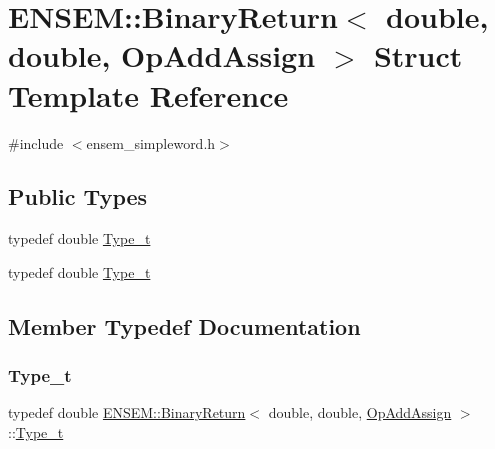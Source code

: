 \hypertarget{structENSEM_1_1BinaryReturn_3_01double_00_01double_00_01OpAddAssign_01_4}{}\section{E\+N\+S\+EM\+:\+:Binary\+Return$<$ double, double, Op\+Add\+Assign $>$ Struct Template Reference}
\label{structENSEM_1_1BinaryReturn_3_01double_00_01double_00_01OpAddAssign_01_4}


{\ttfamily \#include $<$ensem\+\_\+simpleword.\+h$>$}

\subsection*{Public Types}
\begin{DoxyCompactItemize}
\item 
typedef double \mbox{\hyperlink{structENSEM_1_1BinaryReturn_3_01double_00_01double_00_01OpAddAssign_01_4_a9b6757965dc033c66ff45da5c69ea6cc}{Type\+\_\+t}}
\item 
typedef double \mbox{\hyperlink{structENSEM_1_1BinaryReturn_3_01double_00_01double_00_01OpAddAssign_01_4_a9b6757965dc033c66ff45da5c69ea6cc}{Type\+\_\+t}}
\end{DoxyCompactItemize}


\subsection{Member Typedef Documentation}
\mbox{\label{structENSEM_1_1BinaryReturn_3_01double_00_01double_00_01OpAddAssign_01_4_a9b6757965dc033c66ff45da5c69ea6cc}} 
\subsubsection{\texorpdfstring{Type\_t}{Type\_t}\hspace{0.1cm}{\footnotesize\ttfamily [1/2]}}
{\footnotesize\ttfamily typedef double \mbox{\hyperlink{structENSEM_1_1BinaryReturn}{E\+N\+S\+E\+M\+::\+Binary\+Return}}$<$ double, double, \mbox{\hyperlink{structENSEM_1_1OpAddAssign}{Op\+Add\+Assign}} $>$\+::\mbox{\hyperlink{structENSEM_1_1BinaryReturn_3_01double_00_01double_00_01OpAddAssign_01_4_a9b6757965dc033c66ff45da5c69ea6cc}{Type\+\_\+t}}}

